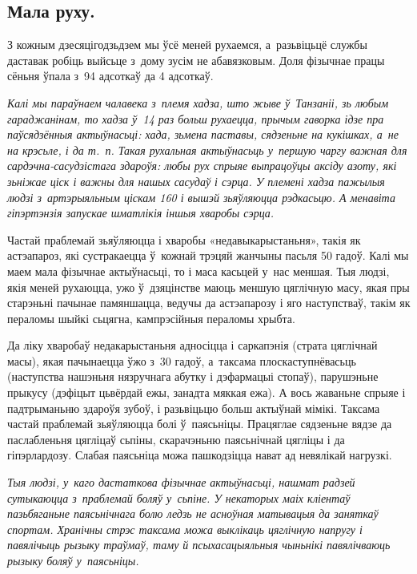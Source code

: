 
\subsection*{Мала руху.}

З кожным дзесяцігодзьдзем мы ўсё меней рухаемся, а~разьвіцьцё службы даставак робіць выйсьце з~дому зусім не абавязковым. Доля фізычнае працы сёньня ўпала з~94 адсоткаў да 4 адсоткаў. 

\emph{Калі мы параўнаем чалавека з~племя хадза, што жыве ў~Танзаніі, зь любым гараджанінам, то хадза ў~14 раз больш рухаецца, прычым гаворка ідзе пра паўсядзённыя актыўнасьці: хада, зьмена паставы, сядзеньне на кукішках, а~не на крэсьле, і да т.~п. Такая рухальная актыўнасьць у~першую чаргу важная для сардэчна-сасудзістага здароўя: любы рух спрыяе выпрацоўцы аксіду азоту, які зьніжае ціск і важны для нашых сасудаў і сэрца. У племені хадза пажылыя людзі з~артэрыяльным ціскам 160 і вышэй зьяўляюцца рэдкасьцю. А менавіта гіпэртэнзія запускае шматлікія іншыя хваробы сэрца.}

Частай праблемай зьяўляюцца і хваробы «недавыкарыстаньня», такія як астэапароз, які сустракаецца ў~кожнай трэцяй жанчыны пасьля 50 гадоў. Калі мы маем мала фізычнае актыўнасьці, то і маса касьцей у~нас меншая. Тыя людзі, якія меней рухаюцца, ужо ў~дзяцінстве маюць меншую цяглічную масу, якая пры старэньні пачынае памяншацца, ведучы да астэапарозу і яго наступстваў, такім як пераломы шыйкі сьцягна, кампрэсійныя пераломы хрыбта.

Да ліку хваробаў недакарыстаньня адносіцца і саркапэнія (страта цяглічнай масы), якая пачынаецца ўжо з~30 гадоў, а~таксама плоскаступнёвасьць (наступства нашэньня нязручнага абутку і дэфармацыі стопаў), парушэньне прыкусу (дэфіцыт цьвёрдай ежы, занадта мяккая ежа). А вось жаваньне спрыяе і падтрыманьню здароўя зубоў, і разьвіцьцю больш актыўнай мімікі. Таксама частай праблемай зьяўляюцца болі ў~паясьніцы. Працяглае сядзеньне вядзе да паслабленьня цягліцаў сьпіны, скарачэньню паясьнічнай цягліцы і да гіпэрлардозу. Слабая паясьніца можа пашкодзіцца нават ад невялікай нагрузкі.

\emph{Тыя людзі, у~каго дастаткова фізычнае актыўнасьці, нашмат радзей сутыкаюцца з~праблемай боляў у~сьпіне. У некаторых маіх кліентаў пазьбяганьне паясьнічнага болю ледзь не асноўная матывацыя да заняткаў спортам. Хранічны стрэс таксама можа выклікаць цяглічную напругу і павялічыць рызыку траўмаў, таму й псыхасацыяльныя чыньнікі павялічваюць рызыку боляў у~паясьніцы.}

